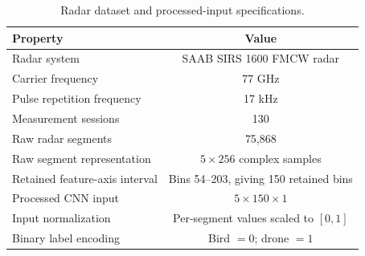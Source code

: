 \begin{table}[htbp]
\centering
\small
\begin{tabular}{lc}
\toprule
Property & Value \\
\midrule
Radar system & SAAB SIRS 1600 FMCW radar \\
Carrier frequency & 77 GHz \\
Pulse repetition frequency & 17 kHz \\
Measurement sessions & 130 \\
Raw radar segments & 75,868 \\
Raw segment representation & $5 \times 256$ complex samples \\
Retained feature-axis interval & Bins 54--203, giving 150 retained bins \\
Processed CNN input & $5 \times 150 \times 1$ \\
Input normalization & Per-segment values scaled to $[0,1]$ \\
Binary label encoding & Bird $=0$; drone $=1$ \\
\bottomrule
\end{tabular}
\caption{Radar dataset and processed-input specifications.}
\label{tab:dataset-specifications}
\end{table}
